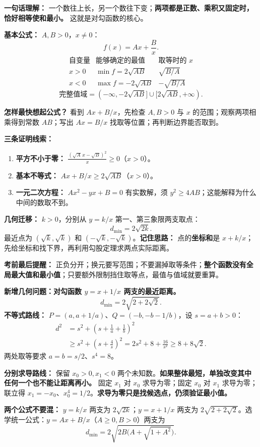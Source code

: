 \clearpage
\begin{summarybox}
\textbf{一句话理解：} 一个数往上长，另一个数往下变；\textbf{两项都是正数、乘积又固定时，恰好相等使和最小。} 这就是对勾函数的核心。

\medskip
\textbf{基本公式：} $A,B>0$，$x\ne0$：
\[
\boxed{f(x)=Ax+\frac Bx}.
\]
\[
\begin{array}{c|c|c}
\text{自变量}&\text{能够确定的最值}&\text{取等时的 }x\\\hline
x>0&\min f=2\sqrt{AB}&\sqrt{B/A}\\[3pt]
x<0&\max f=-2\sqrt{AB}&-\sqrt{B/A}
\end{array}
\]
\[
\boxed{\text{完整值域}=(-\infty,-2\sqrt{AB}]\cup[2\sqrt{AB},+\infty)}.
\]

\textbf{怎样最快想起公式？} 看到 $Ax+B/x$，先检查 $A,B>0$ 与 $x$ 的范围；观察两项相乘得到常数 $AB$；写出 $Ax=B/x$ 找取等位置；再判断边界能否取到。

\medskip
\textbf{三条证明线索：}
\begin{enumerate}[leftmargin=*,itemsep=0.25em]
\item \textbf{平方不小于零：} $\frac{(\sqrt A\,x-\sqrt B)^2}{x}\ge0$（$x>0$）。
\item \textbf{基本不等式：} $Ax+B/x\ge2\sqrt{AB}$（$x>0$）。
\item \textbf{一元二次方程：} $Ax^2-yx+B=0$ 有实数解，须 $y^2\ge4AB$；这能解释为什么中间的数取不到。
\end{enumerate}

\medskip
\textbf{几何迁移：} $k>0$，分别从 $y=k/x$ 第一、第三象限两支取点：
\[
\boxed{d_{\min}=2\sqrt{2k}}.
\]
最近点为 $(\sqrt{k},\sqrt{k})$ 和 $(-\sqrt{k},-\sqrt{k})$。\textbf{记住思路：} 点的\textbf{坐标和}是 $x+k/x$；先给坐标和找下界，再利用勾股定理求两点实际距离。

\medskip
\textbf{考前最后提醒：} 正负分开；换元要写范围；不要漏掉取等条件；\textbf{整个函数没有全局最大值和最小值}；只要额外限制挡住取等点，最值与值域就要重算。


\medskip
\textbf{新增几何问题：对勾函数 $y=x+1/x$ 两支的最近距离。}
\[
\boxed{d_{\min}=2\sqrt{2+2\sqrt2}}.
\]
\textbf{不等式路线：} $P=(a,a+1/a)$、$Q=(-b,-b-1/b)$，设 $s=a+b>0$：
\[
\begin{aligned}
d^2&=s^2+\left(s+\frac1a+\frac1b\right)^2\\
&\ge s^2+\left(s+\frac4s\right)^2
=2s^2+8+\frac{16}{s^2}\ge8+8\sqrt2.
\end{aligned}
\]
两处取等要求 $a=b=s/2$、$s^4=8$。

\textbf{分别求导路线：} 保留 $x_0>0,x_1<0$ 两个未知数。\textbf{如果整体最短，单独改变其中任何一个也不能让距离再小。} 固定 $x_1$ 对 $x_0$ 求导为零；固定 $x_0$ 对 $x_1$ 求导为零；联立得 $x_1=-x_0$、$x_0^4=1/2$。\textbf{求导为零只是找候选点，仍须验证最小值。}

\textbf{两个公式不要混：} $y=k/x$ 两支为 $2\sqrt{2k}$；$y=x+1/x$ 两支为 $2\sqrt{2+2\sqrt2}$。选学统一公式：$y=Ax+B/x$（$A\ge0,B>0$）两支为
\[
\boxed{d_{\min}=2\sqrt{2B\bigl(A+\sqrt{1+A^2}\bigr)}}.
\]
\end{summarybox}
